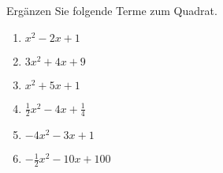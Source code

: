\documentclass[12pt]{article}
\begin{document}
\begin{exercise}
Ergänzen Sie folgende Terme zum Quadrat.
\begin{enumerate}[2col, label=\alph*)]
\item $x^2 - 2x + 1$
\item $3x^2 + 4x + 9$
\item $x^2 +5x + 1$
\item $\frac{1}{2}x^2 -4x + \frac{1}{4}$
\item $-4x^2 -3x + 1$
\item $-\frac{1}{2}x^2 - 10x + 100$\\
\end{enumerate}
\end{exercise}
%
%
%
%
\end{document}
